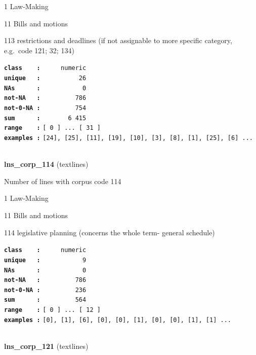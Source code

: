 \documentclass[]{article}
\begin{document}
1 Law-Making

11 Bills and motions

113 restrictions and deadlines (if not assignable to more specific
category, e.g.~code 121; 32; 134)

\textbf{\texttt{class\ \ \ \ :}} \texttt{~~~~~numeric}\\
\textbf{\texttt{unique\ \ \ :}} \texttt{~~~~~~~~~~26}\\
\textbf{\texttt{NAs\ \ \ \ \ \ :}} \texttt{~~~~~~~~~~~0}\\
\textbf{\texttt{not-NA\ \ \ :}} \texttt{~~~~~~~~~786}\\
\textbf{\texttt{not-0-NA\ :}} \texttt{~~~~~~~~~754}\\
\textbf{\texttt{sum\ \ \ \ \ \ :}} \texttt{~~~~~~~6~415}\\
\textbf{\texttt{range\ \ \ \ :}}
\texttt{{[}\ 0\ {]}\ ...\ {[}\ 31\ {]}}\\
\textbf{\texttt{examples\ :}}
\texttt{{[}24{]},\ {[}25{]},\ {[}11{]},\ {[}19{]},\ {[}10{]},\ {[}3{]},\ {[}8{]},\ {[}1{]},\ {[}25{]},\ {[}6{]}\ ...}\\

~

\textbf{lns\_corp\_114} (textlines)

Number of lines with corpus code 114

1 Law-Making

11 Bills and motions

114 legislative planning (concerns the whole term- general schedule)

\textbf{\texttt{class\ \ \ \ :}} \texttt{~~~~~numeric}\\
\textbf{\texttt{unique\ \ \ :}} \texttt{~~~~~~~~~~~9}\\
\textbf{\texttt{NAs\ \ \ \ \ \ :}} \texttt{~~~~~~~~~~~0}\\
\textbf{\texttt{not-NA\ \ \ :}} \texttt{~~~~~~~~~786}\\
\textbf{\texttt{not-0-NA\ :}} \texttt{~~~~~~~~~236}\\
\textbf{\texttt{sum\ \ \ \ \ \ :}} \texttt{~~~~~~~~~564}\\
\textbf{\texttt{range\ \ \ \ :}}
\texttt{{[}\ 0\ {]}\ ...\ {[}\ 12\ {]}}\\
\textbf{\texttt{examples\ :}}
\texttt{{[}0{]},\ {[}1{]},\ {[}6{]},\ {[}0{]},\ {[}0{]},\ {[}1{]},\ {[}0{]},\ {[}0{]},\ {[}1{]},\ {[}1{]}\ ...}\\

~

\textbf{lns\_corp\_121} (textlines)
\end{document}
